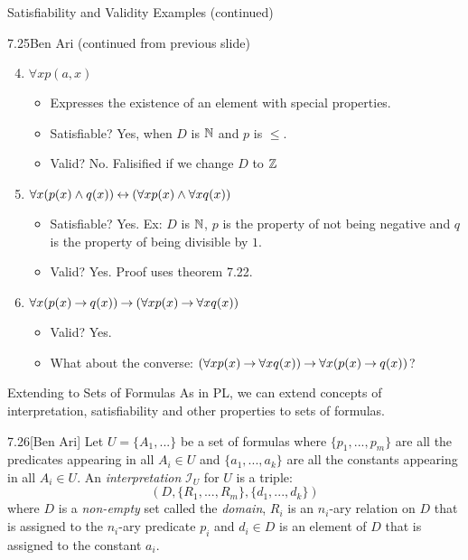 \documentclass[style=sailor,size=12pt]{powerdot}
\begin{document}
\begin{wideslide}[bm=,toc=]{Satisfiability and Validity Examples (continued)}
\begin{defn}{7.25}{Ben Ari}
(continued from previous slide)
\end{defn}
\begin{enumerate}
\setcounter{enumi}{3}
\item<2-> $\forall x p(a,x)$
\begin{itemize}
\item<3-> Expresses the existence of an element with special properties.
\item<3-> Satisfiable? \pause[3] Yes, when $D$ is $\mathbb{N}$ and $p$ is $\leq$.
\item<3-> Valid? \pause No. Falisified if we change $D$ to $\mathbb{Z}$ 
\end{itemize}
\item<6-> $\forall x (p(x) \land q(x)) \mathbin{\leftrightarrow} (\forall x p(x) \land \forall x
    q(x))$
\begin{itemize}
\item<7-> Satisfiable? \pause[3] Yes. Ex: $D$ is $\mathbb{N}$, $p$ is the property of
not being negative and $q$ is the property of being divisible by $1$. 
\item<7-> Valid? \pause Yes. Proof uses theorem 7.22. 
\end{itemize}
\item<10-> $\forall x (p(x) \mathbin{\rightarrow} q(x)) \mathbin{\rightarrow} (\forall x p(x) \mathbin{\rightarrow} \forall x q(x))$
\begin{itemize}
\item<11-> Valid? \pause Yes. 
\item<11-> What about the converse: $(\forall x p(x) \mathbin{\rightarrow} \forall x q(x)) \mathbin{\rightarrow} \forall x (p(x) \mathbin{\rightarrow} q(x))$?
\end{itemize}
\end{enumerate}
\end{wideslide}

\begin{wideslide}[bm=,toc=]{Extending to Sets of Formulas}
As in PL, we can extend concepts of interpretation, satisfiability and other
properties to sets of formulas.
\begin{defn}{7.26}[Ben Ari]
Let $U = \{A_1,...\}$ be a set of formulas where $\{p_1,...,p_m\}$ are all
the predicates appearing in all $A_i \in U$ and $\{a_1,...,a_k\}$ are all the
constants appearing in all $A_i \in U$. An \emph{interpretation} $\mathcal{I}_U$
for $U$ is a triple:
\[(D, \{R_1,...,R_m\},\{d_1,...,d_k\})\]
where $D$ is a \emph{non-empty} set called the \emph{domain}, $R_i$ is an
$n_i$-ary relation on $D$ that is assigned to the $n_i$-ary predicate $p_i$
and $d_i \in D$ is an element of $D$ that is assigned to the constant $a_i$.
\end{defn}

\end{wideslide}
\end{document}
